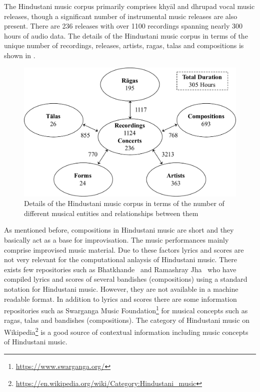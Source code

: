 The Hindustani music corpus primarily comprises khy\={a}l and dhrupad vocal music releases, though a significant number of instrumental music releases are also present. There are 236 releases with over 1100 recordings spanning nearly 300 hours of audio data. The details of the Hindustani music corpus in terms of the unique number of recordings, releases, artists, \glspl{raga}, \glspl{tala} and compositions is shown in .


\begin{figure}
	\begin{center}
		\includegraphics[width=\figSizeNinety]{ch04_datasets/figures/hindustani_corpus_main.pdf}
	\end{center}
	\caption[Details of the Hindustani music corpus]{Details of the Hindustani music corpus in terms of the number of different musical entities and relationships between them}
	\label{fig:hindustani_corpus_details}
\end{figure}


As mentioned before, compositions in Hindustani music are short and they basically act as a base for improvisation. The music performances mainly comprise improvised music material. Due to these factors lyrics and scores are not very relevant for the computational anlaysis of Hindustani music. There exists few repositories such as Bhatkhande~\citep{Bhatkhande_1990} and Ramashray Jha~\citep{R_Jha_2001} who have compiled lyrics and scores of several bandishes (compositions) using a standard notation for Hindustani music. However, they are not available in a machine readable format. In addition to lyrics and scores there are some information repositories such as Swarganga Music Foundation\footnote{\url{https://www.swarganga.org/}} for musical concepts such as \glspl{raga}, \glspl{tala} and bandishes (compositions). The category of Hindustani music on Wikipedia\footnote{\url{https://en.wikipedia.org/wiki/Category:Hindustani_music}} is a good source of contextual information including music concepts of Hindustani music.


